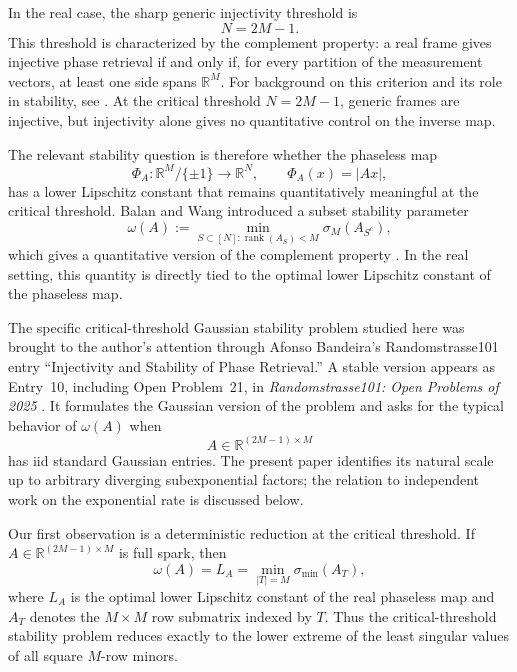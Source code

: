 \documentclass[11pt]{article}
\newcommand{\1}{\mathbf 1}
\begin{document}
In the real case, the sharp generic injectivity threshold is
\[
        N=2M-1.
\]
This threshold is characterized by the complement property: a real frame gives
injective phase retrieval if and only if, for every partition of the
measurement vectors, at least one side spans \(\mathbb R^M\). For background on
this criterion and its role in stability, see
\cite{BandeiraCahillMixonNelson2014}. At the critical threshold \(N=2M-1\),
generic frames are injective, but injectivity alone gives no quantitative
control on the inverse map.

The relevant stability question is therefore whether the phaseless map
\[
        \Phi_A:\mathbb R^M/\{\pm1\}\to\mathbb R^N,
        \qquad
        \Phi_A(x)=|Ax|,
\]
has a lower Lipschitz constant that remains quantitatively meaningful at the
critical threshold. Balan and Wang introduced a subset stability parameter
\[
        \omega(A)
        :=
        \min_{S\subset[N]:\operatorname{rank}(A_S)<M}
        \sigma_M(A_{S^c}),
\]
which gives a quantitative version of the complement property
\cite{BalanWang2015}. In the real setting, this quantity is directly tied to
the optimal lower Lipschitz constant of the phaseless map.

The specific critical-threshold Gaussian stability problem studied here was
brought to the author's attention through Afonso Bandeira's Randomstrasse101
entry ``Injectivity and Stability of Phase Retrieval.''  A stable version
appears as Entry~10, including Open Problem~21, in
\emph{Randomstrasse101: Open Problems of 2025}
\cite{BandeiraDmitrievLuccaNizicNikolacRodder2026}.  It formulates the Gaussian
version of the problem and asks for the typical behavior of \(\omega(A)\) when
\[
        A\in\mathbb R^{(2M-1)\times M}
\]
has iid standard Gaussian entries. The present paper identifies its natural scale up to arbitrary diverging
subexponential factors; the relation to independent work on the exponential
rate is discussed below.

Our first observation is a deterministic reduction at the critical threshold.
If \(A\in\mathbb R^{(2M-1)\times M}\) is full spark, then
\[
        \omega(A)
        =
        L_A
        =
        \min_{|T|=M}\sigma_{\min}(A_T),
\]
where \(L_A\) is the optimal lower Lipschitz constant of the real phaseless map
and \(A_T\) denotes the \(M\times M\) row submatrix indexed by \(T\). Thus the
critical-threshold stability problem reduces exactly to the lower extreme of
the least singular values of all square \(M\)-row minors.
\end{document}
